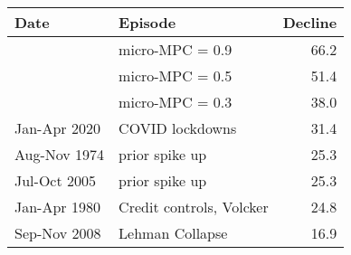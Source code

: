 \begin{tabular}{llr}
\toprule
        Date &                  Episode &  Decline \\
\midrule
             &          micro-MPC = 0.9 &     66.2 \\
             &          micro-MPC = 0.5 &     51.4 \\
             &          micro-MPC = 0.3 &     38.0 \\
Jan-Apr 2020 &          COVID lockdowns &     31.4 \\
Aug-Nov 1974 &           prior spike up &     25.3 \\
Jul-Oct 2005 &           prior spike up &     25.3 \\
Jan-Apr 1980 & Credit controls, Volcker &     24.8 \\
Sep-Nov 2008 &          Lehman Collapse &     16.9 \\
\bottomrule
\end{tabular}
